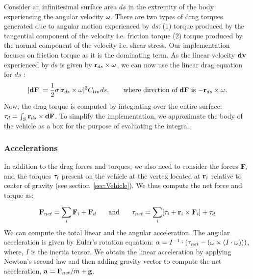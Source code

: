 \documentclass[graybox]{svmult}
\begin{document}
Consider an infinitesimal surface area $ds$ in the extremity of the body experiencing the angular velocity ${\bf \omega}$. There are two types of drag torques generated due to angular motion experienced by $ds$: (1) torque produced by the tangential component of the velocity i.e. friction torque (2) torque produced by the normal component of the velocity i.e. shear stress. Our implementation focuses on friction torque as it is the dominating term. As the linear velocity ${\bf dv}$ experienced by $ds$ is given by ${\bf r}_{ds} \times {\bf \omega}$, we can now use the linear drag equation for $ds$ \cite{nakayama1998introduction}:
\begin{equation*}
|{\bf dF}| = \frac{1}{2}\sigma |{\bf r}_{ds} \times {\bf \omega}|^{2} C_{lin} {ds}
\mbox{,\hspace{0.25in} where direction of ${\bf dF}$ is $-{\bf r}_{ds} \times {\bf \omega}$}.
\end{equation*}
Now, the drag torque is computed by integrating over the entire surface: ${\bf \tau}_{d} = \int_{S} {\bf r}_{ds} \times {\bf dF}$.
To simplify the implementation, we approximate the body of the vehicle as a box for the purpose of evaluating the integral.

\subsubsection{Accelerations}
In addition to the drag forces and torques, we also need to consider the forces ${\bf F}_i$ and the torques ${\bf \tau}_i$ present on the vehicle at the vertex located at ${\bf r}_i$  relative to center of gravity (see section~\ref{sec:Vehicle}). We thus compute the net force and torque as:

\begin{align*}
{\bf F}_{net} = \sum_{i} {\bf F}_{i} + {\bf F}_d\mbox{\hspace{0.25in}and\hspace{0.25in}} {\bf \tau}_{net} = \sum_{i} [{\bf \tau}_i + {\bf r}_{i} \times {\bf F}_{i}] + {\bf \tau}_d
\end{align*}
We can compute the total linear and the angular acceleration. The angular acceleration is given by Euler's rotation equation:
${\bf \alpha} = I^{-1} \cdot ({\bf \tau}_{net} - ({\bf \omega} \times (I \cdot {\bf \omega})))$,
where, $I$ is the inertia tensor. We obtain the linear acceleration by applying Newton's second law and then adding gravity vector to compute the net acceleration,
${\bf a} = {\bf F}_{net} / m + {\bf g}$.
\end{document}
